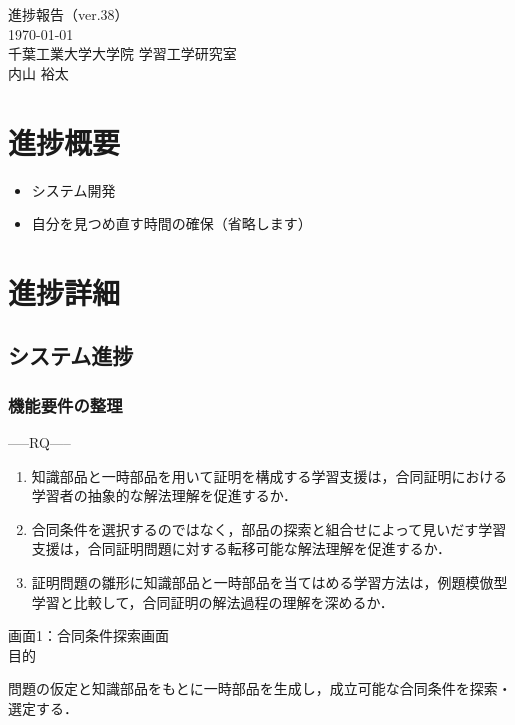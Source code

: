 \documentclass[a4paper,12pt]{ltjsarticle}
\begin{document}
\begin{center}
  {\huge 進捗報告（ver.38）}\\[1em]
  {\large \today}\\
  {\large 千葉工業大学大学院 学習工学研究室}\\
  {\large 内山 裕太}
\end{center}

\vspace{2em}

\section{進捗概要}
\begin{itemize}
  \item システム開発
  \item 自分を見つめ直す時間の確保（省略します）
\end{itemize}
\newpage

\section{進捗詳細}
\subsection{システム進捗}
\subsubsection{機能要件の整理}
-----RQ-----
\begin{enumerate}
  \item 知識部品と一時部品を用いて証明を構成する学習支援は，合同証明における学習者の抽象的な解法理解を促進するか．
  \item 合同条件を選択するのではなく，部品の探索と組合せによって見いだす学習支援は，合同証明問題に対する転移可能な解法理解を促進するか．
  \item 証明問題の雛形に知識部品と一時部品を当てはめる学習方法は，例題模倣型学習と比較して，合同証明の解法過程の理解を深めるか．
\end{enumerate}

画面1：合同条件探索画面\\

目的

問題の仮定と知識部品をもとに一時部品を生成し，成立可能な合同条件を探索・選定する．\\
\end{document}
